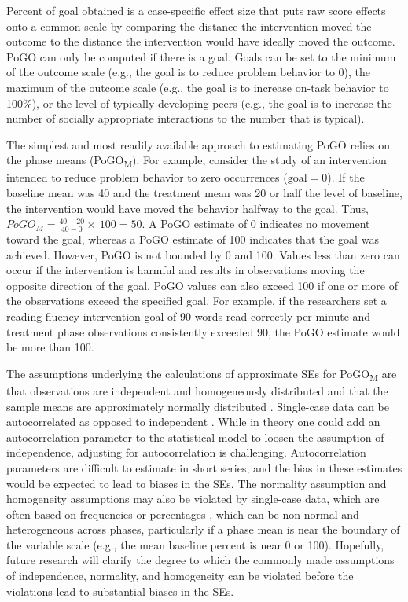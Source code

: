 \documentclass[
]{book}
\begin{document}
Percent of goal obtained \citep[PoGO;][]{Ferron_Goldstein_Olszewski_Rohrer_2020} is a case-specific effect size that puts raw score effects onto a common scale by comparing the distance the intervention moved the outcome to the distance the intervention would have ideally moved the outcome. PoGO can only be computed if there is a goal. Goals can be set to the minimum of the outcome scale (e.g., the goal is to reduce problem behavior to 0), the maximum of the outcome scale (e.g., the goal is to increase on-task behavior to 100\(\%\)), or the level of typically developing peers (e.g., the goal is to increase the number of socially appropriate interactions to the number that is typical).

The simplest and most readily available approach to estimating PoGO relies on the phase means (PoGO\textsubscript{M}). For example, consider the study of an intervention intended to reduce problem behavior to zero occurrences (\(\text{goal} = 0\)). If the baseline mean was 40 and the treatment mean was 20 or half the level of baseline, the intervention would have moved the behavior halfway to the goal. Thus, \(PoGO_M = \frac{40-20}{40-0} \times \ 100 = 50\). A PoGO estimate of 0 indicates no movement toward the goal, whereas a PoGO estimate of 100 indicates that the goal was achieved. However, PoGO is not bounded by 0 and 100. Values less than zero can occur if the intervention is harmful and results in observations moving the opposite direction of the goal. PoGO values can also exceed 100 if one or more of the observations exceed the specified goal. For example, if the researchers set a reading fluency intervention goal of 90 words read correctly per minute and treatment phase observations consistently exceeded 90, the PoGO estimate would be more than 100.

The assumptions underlying the calculations of approximate SEs for PoGO\textsubscript{M} are that observations are independent and homogeneously distributed and that the sample means are approximately normally distributed \citep{Patrona2022}. Single-case data can be autocorrelated as opposed to independent \citep{matyas1997Serial, Shadish_Sullivan_2011}. While in theory one could add an autocorrelation parameter to the statistical model to loosen the assumption of independence, adjusting for autocorrelation is challenging. Autocorrelation parameters are difficult to estimate in short series, and the bias in these estimates would be expected to lead to biases in the SEs. The normality assumption and homogeneity assumptions may also be violated by single-case data, which are often based on frequencies or percentages \citep{Shadish_Sullivan_2011}, which can be non-normal and heterogeneous across phases, particularly if a phase mean is near the boundary of the variable scale (e.g., the mean baseline percent is near 0 or 100). Hopefully, future research will clarify the degree to which the commonly made assumptions of independence, normality, and homogeneity can be violated before the violations lead to substantial biases in the SEs.
\end{document}
